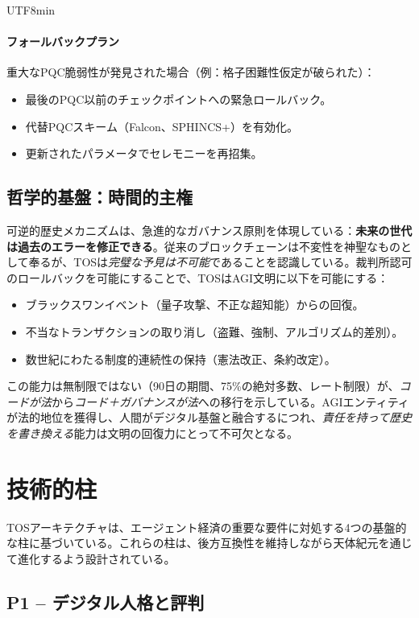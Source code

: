 \documentclass[11pt]{article}
\begin{document}
\begin{CJK}{UTF8}{min}
\paragraph{フォールバックプラン}
重大なPQC脆弱性が発見された場合（例：格子困難性仮定が破られた）：
\begin{itemize}[noitemsep]
  \item 最後のPQC以前のチェックポイントへの緊急ロールバック。
  \item 代替PQCスキーム（Falcon、SPHINCS+）を有効化。
  \item 更新されたパラメータでセレモニーを再招集。
\end{itemize}

\subsection{哲学的基盤：時間的主権}

可逆的歴史メカニズムは、急進的なガバナンス原則を体現している：\textbf{未来の世代は過去のエラーを修正できる}。従来のブロックチェーンは不変性を神聖なものとして奉るが、TOSは\emph{完璧な予見は不可能}であることを認識している。裁判所認可のロールバックを可能にすることで、TOSはAGI文明に以下を可能にする：
\begin{itemize}[noitemsep]
  \item ブラックスワンイベント（量子攻撃、不正な超知能）からの回復。
  \item 不当なトランザクションの取り消し（盗難、強制、アルゴリズム的差別）。
  \item 数世紀にわたる制度的連続性の保持（憲法改正、条約改定）。
\end{itemize}

この能力は無制限ではない（90日の期間、75\%の絶対多数、レート制限）が、\emph{コードが法}から\emph{コード＋ガバナンスが法}への移行を示している。AGIエンティティが法的地位を獲得し、人間がデジタル基盤と融合するにつれ、\emph{責任を持って歴史を書き換える}能力は文明の回復力にとって不可欠となる。

\section{技術的柱}

TOSアーキテクチャは、エージェント経済の重要な要件に対処する4つの基盤的な柱に基づいている。これらの柱は、後方互換性を維持しながら天体紀元を通じて進化するよう設計されている。

\subsection{P1 -- デジタル人格と評判}
\label{sec:pillar-identity}


\end{CJK}
\end{document}
